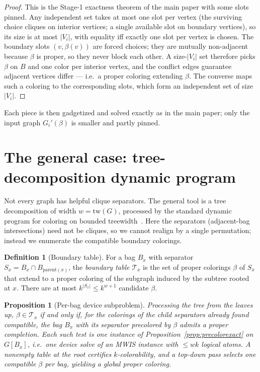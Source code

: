 \documentclass[11pt]{article}
\newtheorem{proposition}[theorem]{Proposition}
\theoremstyle{definition}
\newtheorem{definition}[theorem]{Definition}
\theoremstyle{remark}
\newcommand{\tw}{\mathrm{tw}}
\begin{document}
\begin{proof}
This is the Stage-1 exactness theorem of the main paper with some slots pinned.
Any independent set takes at most one slot per vertex (the surviving choice
cliques on interior vertices; a single available slot on boundary vertices), so
its size is at most $|V_i|$, with equality iff exactly one slot per vertex is
chosen. The boundary slots $(v,\beta(v))$ are forced choices; they are mutually
non-adjacent because $\beta$ is proper, so they never block each other. A size-$|V_i|$
set therefore picks $\beta$ on $B$ and one color per interior vertex, and the
conflict edges guarantee adjacent vertices differ --- i.e.\ a proper coloring
extending $\beta$. The converse maps such a coloring to the corresponding slots,
which form an independent set of size $|V_i|$.
\end{proof}

Each piece is then gadgetized and solved exactly as in the main paper; only the
input graph $G_i'(\beta)$ is smaller and partly pinned.

\section{The general case: tree-decomposition dynamic program}
\label{sec:treedp}

Not every graph has helpful clique separators. The general tool is a tree
decomposition of width $w=\tw(G)$, processed by the standard dynamic program for
coloring on bounded treewidth~\cite{ArnborgProskurowski1989}. Here the separators
(adjacent-bag intersections) need not be cliques, so we cannot realign by a single
permutation; instead we enumerate the compatible boundary colorings.

\begin{definition}[Boundary table]
For a bag $B_x$ with separator $S_x=B_x\cap B_{\mathrm{parent}(x)}$, the
\emph{boundary table} $\mathcal{T}_x$ is the set of proper colorings $\beta$ of
$S_x$ that extend to a proper coloring of the subgraph induced by the subtree
rooted at $x$. There are at most $k^{|S_x|}\le k^{w+1}$ candidate $\beta$.
\end{definition}

\begin{proposition}[Per-bag device subproblem]
\label{prop:bagdp}
Processing the tree from the leaves up, $\beta\in\mathcal{T}_x$ if and only if, for
the colorings of the child separators already found compatible, the bag $B_x$ with
its separator precolored by $\beta$ admits a proper completion. Each such test is
one instance of Proposition~\ref{prop:precolorexact} on $G[B_x]$, i.e.\ one
device solve of an MWIS instance with $\le wk$ logical atoms. A nonempty table at
the root certifies $k$-colorability, and a top-down pass selects one compatible
$\beta$ per bag, yielding a global proper coloring.
\end{proposition}
\end{document}
